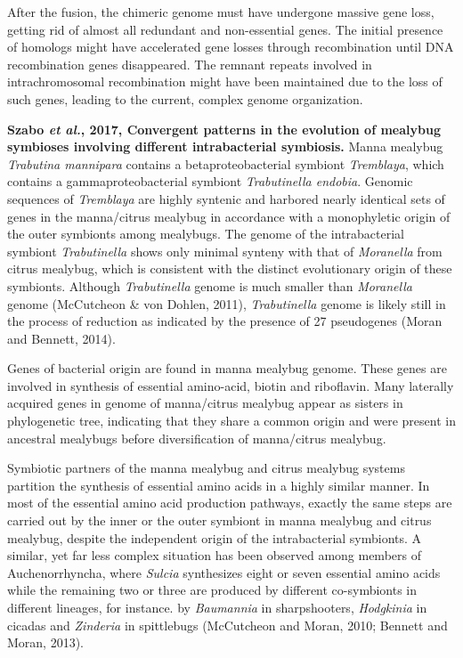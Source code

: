 \documentclass[11pt]{article}
\begin{document}
\begin{sloppypar}
After the fusion, the chimeric genome must have undergone massive gene loss, getting rid of almost all redundant and non-essential genes. 
The initial presence of homologs might have accelerated gene losses through recombination until DNA recombination genes disappeared. 
The remnant repeats involved in intrachromosomal recombination might have been maintained due to the loss of
such genes, leading to the current, complex genome organization.
\par
\textbf{Szabo \textit{et al.}, 2017, Convergent patterns in the evolution of mealybug symbioses involving different intrabacterial symbiosis.} \newline
Manna mealybug \textit{Trabutina mannipara} contains a betaproteobacterial symbiont \textit{Tremblaya}, which contains a gammaproteobacterial symbiont \textit{Trabutinella endobia}. 
Genomic sequences of \textit{Tremblaya} are highly syntenic and harbored nearly identical sets of genes in the manna/citrus mealybug in accordance with a monophyletic origin of the outer symbionts among mealybugs. 
The genome of the intrabacterial symbiont \textit{Trabutinella} shows only minimal synteny with that of \textit{Moranella} from citrus mealybug, which is consistent with the distinct evolutionary origin of these symbionts. 
Although \textit{Trabutinella} genome is much smaller than \textit{Moranella} genome (McCutcheon & von Dohlen, 2011), \textit{Trabutinella} genome is likely still in the process of reduction as indicated by the presence of 27 pseudogenes (Moran and
Bennett, 2014). 
\par
Genes of bacterial origin are found in manna mealybug genome. 
These genes are involved in synthesis of essential amino-acid, biotin and riboflavin. 
Many laterally acquired genes in genome of manna/citrus mealybug appear as sisters in phylogenetic tree, indicating that they share a common origin and were present in ancestral mealybugs before diversification of manna/citrus mealybug.
\par
Symbiotic partners of the manna mealybug and citrus mealybug systems partition the synthesis of essential amino acids in a highly similar manner. 
In most of the essential amino acid production pathways, exactly the same steps are carried out by the inner or the outer symbiont in manna mealybug and citrus mealybug, despite the independent origin of the intrabacterial symbionts. 
A similar, yet far less complex situation has been observed among members of Auchenorrhyncha, where \textit{Sulcia} synthesizes eight or seven essential amino acids while the remaining two or three are produced by different co-symbionts in different lineages, for instance. by \textit{Baumannia} in sharpshooters, \textit{Hodgkinia} in cicadas and \textit{Zinderia} in spittlebugs (McCutcheon and Moran, 2010; Bennett and Moran, 2013).

\end{sloppypar}
\end{document}
